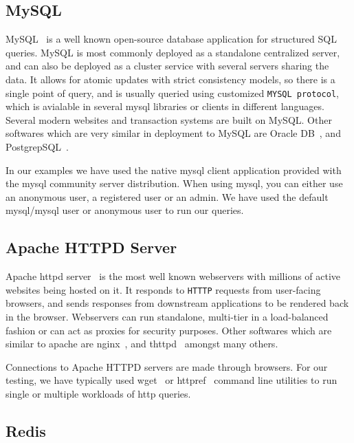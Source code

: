 \subsection{MySQL}

MySQL~\cite{mysql} is a well known open-source database application for structured SQL queries. 
MySQL is most commonly deployed as a standalone centralized server, and can also be deployed as a cluster service with several servers sharing the data. 
It allows for atomic updates with strict consistency models, so there is a single point of query, and is usually queried using customized \texttt{MYSQL protocol}, which is avialable in several mysql libraries or clients in different languages.
Several modern websites and transaction systems are built on MySQL.
Other softwares which are very similar in deployment to MySQL are Oracle DB~\cite{oracle}, and PostgrepSQL~\cite{postgresql}.

In our examples we have used the native mysql client application provided with the mysql community server distribution.
When using mysql, you can either use an anonymous user, a registered user or an admin.
We have used the default mysql/mysql user or anonymous user to run our queries.

\subsection{Apache HTTPD Server}

Apache httpd server~\cite{apache} is the most well known webservers with millions of active websites being hosted on it.
It responds to \texttt{HTTTP} requests from user-facing browsers, and sends responses from downstream applications to be rendered back in the browser.
Webservers can run standalone, multi-tier in a load-balanced fashion or can act as proxies for security purposes.
Other softwares which are similar to apache are nginx~\cite{nginx}, and thttpd~\cite{thttpd} amongst many others.

Connections to Apache HTTPD servers are made through browsers. For our testing, we have typically used wget~\cite{wget} or httpref~\cite{httpref} command line utilities to run single or multiple workloads of http queries.


\subsection{Redis}

